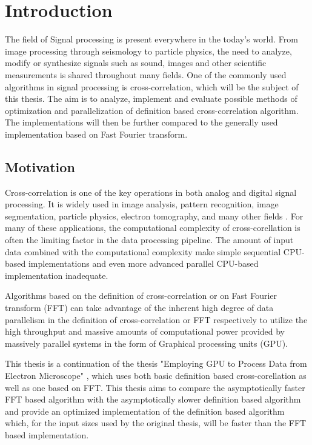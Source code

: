 \chapter*{Introduction}

The field of Signal processing is present everywhere in the today's world. From image processing through seismology to particle physics, the need to analyze, modify or synthesize signals such as sound, images and other scientific measurements is shared throughout many fields. One of the commonly used algorithms in signal processing is cross-correlation, which will be the subject of this thesis. The aim is to analyze, implement and evaluate possible methods of optimization and parallelization of definition based cross-correlation algorithm. The implementations will then be further compared to the generally used implementation based on Fast Fourier transform.

\section*{Motivation}

Cross-correlation is one of the key operations in both analog and digital signal processing.
It is widely used in image analysis, pattern recognition, image segmentation, particle physics, electron tomography, and many other fields \citep{Kapinchev2015}. For many of these applications, the computational complexity of cross-corellation is often the limiting factor in the data processing pipeline. The amount of input data combined with the computational complexity make simple sequential CPU-based implementations and even more advanced parallel CPU-based implementation inadequate.

Algorithms based on the definition of cross-correlation or on Fast Fourier transform (FFT) can take advantage of the inherent high degree of data parallelism in the definition of cross-correlation or FFT respectively to utilize the high throughput and massive amounts of computational power provided by massively parallel systems in the form of Graphical processing units (GPU).

This thesis is a continuation of the thesis "Employing GPU to Process Data from Electron Microscope" \citep{misko}, which uses both basic definition based cross-corellation as well as one based on FFT. This thesis aims to compare the asymptotically faster FFT based algorithm with the asymptotically slower definition based algorithm and provide an optimized implementation of the definition based algorithm which, for the input sizes used by the original thesis, will be faster than the FFT based implementation.

